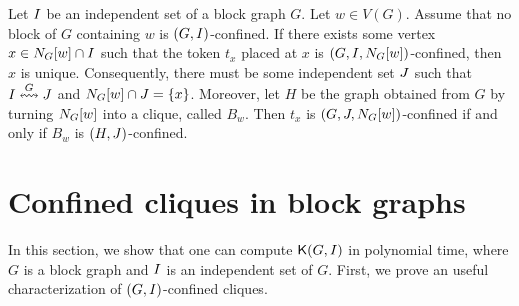 \documentclass[a4paper]{llncs}
\begin{document}
\begin{proposition}
\label{prop:confined-token-in-closed-neghbor}
Let $I$ be an independent set of a block graph $G$.
Let $w \in V(G)$. 
Assume that no block of $G$ containing $w$ is $(G, I)$-confined. 
If there exists some vertex $x \in N_{G}[w] \cap I$ such that the token $t_x$ placed at $x$ is $(G, I, N_{G}[w])$-confined, 
	then $x$ is unique.
Consequently, there must be some independent set $J$ such that $I \overset{G}{\leftrightsquigarrow} J$ and $N_{G}[w] \cap J = \{x\}$.
Moreover, let $H$ be the graph obtained from $G$ by turning $N_{G}[w]$ into a clique, called $B_w$.
Then $t_x$ is $(G, J, N_{G}[w])$-confined if and only if $B_w$ is $(H, J)$-confined.
\end{proposition}


\section{Confined cliques in block graphs}
\label{sec:confined-cliques}

In this section, we show that one can compute ${\mathsf K}{(G, I)}$ in polynomial time, where $G$ is a block graph and $I$ is an independent set of $G$.
First, we prove an useful characterization of $(G, I)$-confined cliques.
\end{document}
